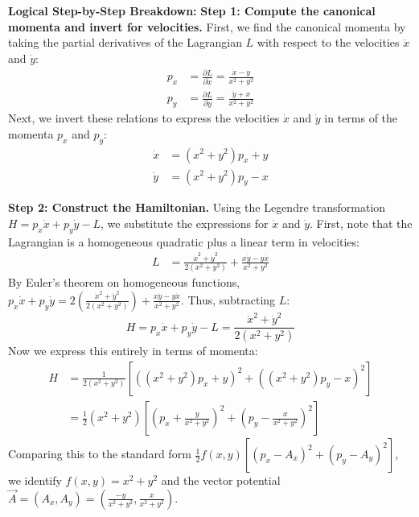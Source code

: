 \begin{solution}
\textbf{Logical Step-by-Step Breakdown:}
\textbf{Step 1: Compute the canonical momenta and invert for velocities.}
First, we find the canonical momenta by taking the partial derivatives of the Lagrangian $L$ with respect to the velocities $\dot{x}$ and $\dot{y}$:
\begin{align*}
    p_x &= \frac{\partial L}{\partial \dot{x}} = \frac{\dot{x} - y}{x^2+y^2} \\
    p_y &= \frac{\partial L}{\partial \dot{y}} = \frac{\dot{y} + x}{x^2+y^2}
\end{align*}
Next, we invert these relations to express the velocities $\dot{x}$ and $\dot{y}$ in terms of the momenta $p_x$ and $p_y$:
\begin{align*}
    \dot{x} &= (x^2+y^2)p_x + y \\
    \dot{y} &= (x^2+y^2)p_y - x
\end{align*}

\textbf{Step 2: Construct the Hamiltonian.}
Using the Legendre transformation $H = p_x \dot{x} + p_y \dot{y} - L$, we substitute the expressions for $\dot{x}$ and $\dot{y}$.
First, note that the Lagrangian is a homogeneous quadratic plus a linear term in velocities:
\begin{align*}
    L &= \frac{\dot{x}^2 + \dot{y}^2}{2(x^2+y^2)} + \frac{x\dot{y} - y\dot{x}}{x^2+y^2}
\end{align*}
By Euler's theorem on homogeneous functions, $p_x \dot{x} + p_y \dot{y} = 2 \left( \frac{\dot{x}^2 + \dot{y}^2}{2(x^2+y^2)} \right) + \frac{x\dot{y} - y\dot{x}}{x^2+y^2}$.
Thus, subtracting $L$:
\begin{equation*}
    H = p_x \dot{x} + p_y \dot{y} - L = \frac{\dot{x}^2 + \dot{y}^2}{2(x^2+y^2)}
\end{equation*}
Now we express this entirely in terms of momenta:
\begin{align*}
    H &= \frac{1}{2(x^2+y^2)} \left[ \left( (x^2+y^2)p_x + y \right)^2 + \left( (x^2+y^2)p_y - x \right)^2 \right] \\
      &= \frac{1}{2}(x^2+y^2) \left[ \left( p_x + \frac{y}{x^2+y^2} \right)^2 + \left( p_y - \frac{x}{x^2+y^2} \right)^2 \right]
\end{align*}
Comparing this to the standard form $\frac{1}{2} f(x, y) \left[ (p_x - A_x)^2 + (p_y - A_y)^2 \right]$, we identify $f(x, y) = x^2+y^2$ and the vector potential $\vec{A} = (A_x, A_y) = \left( \frac{-y}{x^2+y^2}, \frac{x}{x^2+y^2} \right)$.


\end{solution}

